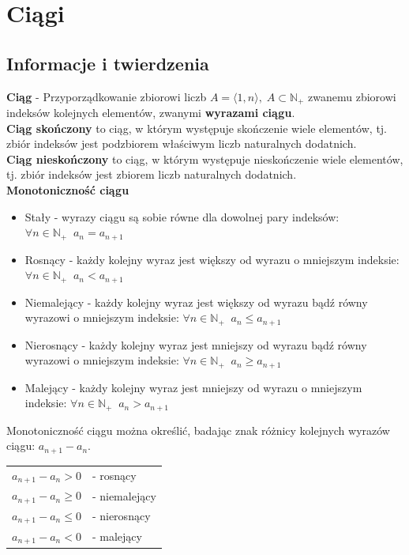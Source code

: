 \documentclass[14pt,a4paper]{extarticle}
\begin{document}
{\begin{center}
\begin{samepage}
   \end{samepage}
\end{center}
}%

\newpage

\section{Ciągi}
\subsection{Informacje i twierdzenia}
\noindent\textbf{Ciąg} - Przyporządkowanie zbiorowi liczb $A = \langle 1, n \rangle,\; A \subset \mathbb{N}_{+}$ zwanemu zbiorowi indeksów kolejnych elementów,
zwanymi \textbf{wyrazami ciągu}.\hfill\break\\
\noindent\textbf{Ciąg skończony} to ciąg, w którym występuje skończenie wiele elementów, tj. zbiór
indeksów jest podzbiorem właściwym liczb naturalnych dodatnich.\\
\noindent\textbf{Ciąg nieskończony} to ciąg, w którym występuje nieskończenie wiele elementów, tj. zbiór
indeksów jest zbiorem liczb naturalnych dodatnich.\hfill\break\\

\noindent\textbf{Monotoniczność ciągu}
\begin{itemize}
   \item Stały - wyrazy ciągu są sobie równe dla dowolnej pary indeksów:\\ $\forall n\in\mathbb{N}_{+}\;\; a_{n} = a_{n+1}$
   \item Rosnący - każdy kolejny wyraz jest większy od wyrazu o mniejszym indeksie: $\forall n\in\mathbb{N}_{+}\;\; a_{n} < a_{n+1}$
   \item Niemalejący - każdy kolejny wyraz jest większy od wyrazu bądź równy wyrazowi o mniejszym indeksie: $\forall n\in\mathbb{N}_{+}\;\; a_{n} \leq a_{n+1}$
   \item Nierosnący - każdy kolejny wyraz jest mniejszy od wyrazu bądź równy wyrazowi o mniejszym indeksie: $\forall n\in\mathbb{N}_{+}\;\; a_{n} \geq a_{n+1}$
   \item Malejący - każdy kolejny wyraz jest mniejszy od wyrazu o mniejszym indeksie: $\forall n\in\mathbb{N}_{+}\;\; a_{n} > a_{n+1}$
\end{itemize}
Monotoniczność ciągu można określić, badając znak różnicy kolejnych wyrazów ciągu: $a_{n+1} - a_{n}$.\\
{%

\renewcommand{\arraycolsep}{0.35cm}
\renewcommand{\arraystretch}{1.4}

\begin{center}
\begin{tabular}{ll}
   $a_{n+1} - a_{n} > 0$ & - \; rosnący\\
   $a_{n+1} - a_{n} \geq 0$ & - \; niemalejący\\
   $a_{n+1} - a_{n} \leq 0$ & - \; nierosnący\\
   $a_{n+1} - a_{n} < 0$ & - \; malejący
\end{tabular}
\end{center}
}%
\end{document}
